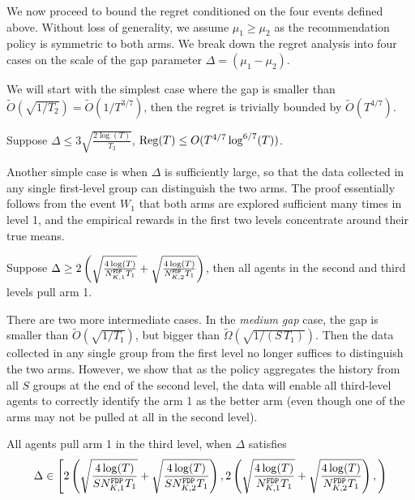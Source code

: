 We now proceed to bound the regret conditioned on the four
events defined above. Without loss of generality, we assume
$\mu_1 \geq \mu_2$ as the recommendation policy is symmetric to both
arms. We break down the regret analysis into four cases on the scale
of the gap parameter $\Delta = (\mu_1-\mu_2)$.


We will start with the simplest case where the gap is smaller than
$\tilde O(\sqrt{1/T_2}) = \tilde O(1/T^{3/7})$, then the regret is
trivially bounded by $\tilde O(T^{4/7})$.

\begin{claim}
  Suppose $\Delta \leq 3\sqrt{\frac{2\log(T)}{T_2}}$,
  $\reg(T)\leq O(T^{4/7} \log^{6/7}(T))$.
\end{claim}

Another simple case is when $\Delta$ is sufficiently large, so that
the data collected in any single first-level group can distinguish the
two arms. The proof essentially follows from the event $W_1$
that both arms are explored sufficient many times in level 1, and the
empirical rewards in the first two levels concentrate around their
true means.

\begin{lemma}\label{3levelbigcase}
  Suppose
  $\Delta \geq 2\left(\sqrt{\frac{4\log(T)}{\fdpN[1]T_1}} +
    \sqrt{\frac{4\log(T)}{\fdpN[2]T_1}}\right)$, then all agents in the
  second and third levels pull arm 1.
\end{lemma}


There are two more intermediate cases. In the \emph{medium gap} case,
the gap is smaller than $\tilde O(\sqrt{1/T_1})$, but bigger than
$\tilde \Omega(\sqrt{1/(S\, T_1)})$. Then the data collected in any
single group from the first level no longer suffices to distinguish
the two arms. However, we show that as the policy aggregates the
history from all $S$ groups at the end of the second level, the data
will enable all third-level agents to correctly identify the arm 1 as
the better arm (even though one of the arms may not be pulled at all
in the second level).

\begin{lemma}\label{3levelmedium}
  All agents pull arm 1 in the third level, when $\Delta$ satisfies
  \[
  \Delta\in \left[
   2\left(\sqrt{\frac{4\log(T)}{S\fdpN[1]T_1}} +
    \sqrt{\frac{4\log(T)}{S\fdpN[2]T_1}}\right),
 2\left(\sqrt{\frac{4\log(T)}{\fdpN[1]T_1}} +
        \sqrt{\frac{4\log(T)}{\fdpN[2]T_1}}\right),
    \right)
  \]
\end{lemma}


